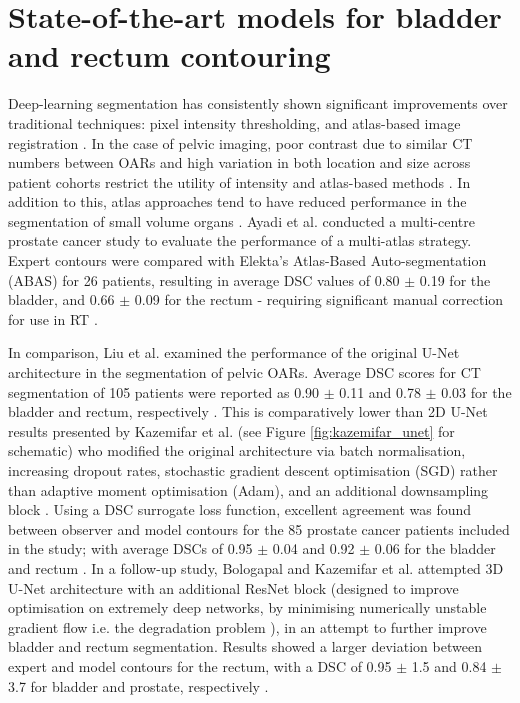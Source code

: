 \section{State-of-the-art models for bladder and rectum contouring}
Deep-learning segmentation has consistently shown significant improvements over traditional techniques: pixel intensity thresholding, and atlas-based image registration \cite{Cardenas2019}. In the case of pelvic imaging, poor contrast due to similar CT numbers between OARs and high variation in both location and size across patient cohorts restrict the utility of intensity and atlas-based methods \cite{acosta2013}. In addition to this, atlas approaches tend to have reduced performance in the segmentation of small volume organs \cite{acosta2013}. Ayadi et al. conducted a multi-centre prostate cancer study to evaluate the performance of a multi-atlas strategy. Expert contours were compared with Elekta's Atlas-Based Auto-segmentation (ABAS) for 26 patients, resulting in average DSC values of 0.80 $\pm$ 0.19 for the bladder, and 0.66 $\pm$ 0.09 for the rectum - requiring significant manual correction for use in RT \cite{Ayadi2011}.

In comparison, Liu et al. examined the performance of the original U-Net architecture in the segmentation of pelvic OARs. Average DSC scores for CT segmentation of 105 patients were reported as 0.90 $\pm$ 0.11 and 0.78 $\pm$ 0.03 for the bladder and rectum, respectively \cite{Liu_2020}. This is comparatively lower than 2D U-Net results presented by Kazemifar et al. (see Figure \ref{fig:kazemifar_unet} for schematic) who modified the original architecture via batch normalisation, increasing dropout rates, stochastic gradient descent optimisation (SGD) rather than adaptive moment optimisation (Adam), and an additional downsampling block \cite{Kazemifar_2018}. Using a DSC surrogate loss function, excellent agreement was found between observer and model contours for the 85 prostate cancer patients included in the study; with average DSCs of 0.95 $\pm$ 0.04 and 0.92 $\pm$ 0.06 for the bladder and rectum \cite{Kazemifar_2018}. In a follow-up study, Bologapal and Kazemifar et al. attempted 3D U-Net architecture with an additional ResNet block (designed to improve optimisation on extremely deep networks, by minimising numerically unstable gradient flow \cite{Maier2019} i.e. the degradation problem \cite{He2015deep}), in an attempt to further improve bladder and rectum segmentation. Results showed a larger deviation between expert and model contours for the rectum, with a DSC of 0.95 $\pm$ 1.5 and 0.84 $\pm$ 3.7 for bladder and prostate, respectively \cite{Balagopal_2018}. 

